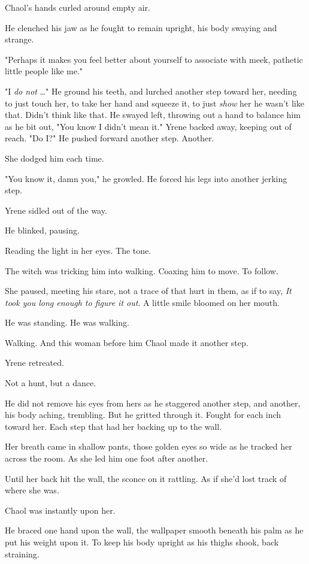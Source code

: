 Chaol's hands curled around empty air.

He clenched his jaw as he fought to remain upright, his body swaying and strange.

"Perhaps it makes you feel better about yourself to associate with meek, pathetic little people like me."

"I \emph{do not} \ldots" He ground his teeth, and lurched another step toward her, needing to just touch her, to take her hand and squeeze it, to just \emph{show} her he wasn't like that. Didn't think like that. He swayed left, throwing out a hand to balance him as he bit out, "You know I didn't mean it." Yrene backed away, keeping out of reach. "Do I?" He pushed forward another step. Another.

She dodged him each time.

"You know it, damn you," he growled. He forced his legs into another jerking step.

Yrene sidled out of the way.

He blinked, pausing.

Reading the light in her eyes. The tone.

The witch was tricking him into walking. Coaxing him to move. To follow.

She paused, meeting his stare, not a trace of that hurt in them, as if to say, \emph{It took you long enough to figure it out}. A little smile bloomed on her mouth.

He was standing. He was  walking.

Walking. And this woman before him  Chaol made it another step.

Yrene retreated.

Not a hunt, but a dance.

He did not remove his eyes from hers as he staggered another step, and another, his body aching, trembling. But he gritted through it. Fought for each inch toward her. Each step that had her backing up to the wall.

Her breath came in shallow pants, those golden eyes so wide as he tracked her across the room. As she led him one foot after another.

Until her back hit the wall, the sconce on it rattling. As if she'd lost track of where she was.

Chaol was instantly upon her.

He braced one hand upon the wall, the wallpaper smooth beneath his palm as he put his weight upon it. To keep his body upright as his thighs shook, back straining.

